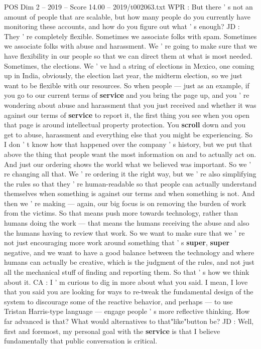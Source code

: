 \begin{textsample}{POS Dim 2 – 2019 – Score 14.00 – 2019/t002063.txt}
WPR : But there ' s not an amount of people that are scalable, but how many people do you currently have monitoring these accounts, and how do you figure out what ' s enough?
JD : They ' re completely flexible.
Sometimes we associate folks with spam.
Sometimes we associate folks with abuse and harassment.
We ' re going to make sure that we have flexibility in our people so that we can direct them at what is most needed.
Sometimes, the elections.
We ' ve had a string of elections in Mexico, one coming up in India, obviously, the election last year, the midterm election, so we just want to be flexible with our resources.
So when people — just as an example, if you go to our current terms of \textbf{service} and you bring the page up, and you ' re wondering about abuse and harassment that you just received and whether it was against our terms of \textbf{service} to report it, the first thing you see when you open that page is around intellectual property protection.
You \textbf{scroll} down and you get to abuse, harassment and everything else that you might be experiencing.
So I don ' t know how that happened over the company ' s history, but we put that above the thing that people want the most information on and to actually act on.
And just our ordering shows the world what we believed was important.
So we ' re changing all that.
We ' re ordering it the right way, but we ' re also simplifying the rules so that they ' re human-readable so that people can actually understand themselves when something is against our terms and when something is not.
And then we ' re making — again, our big focus is on removing the burden of work from the victims.
So that means push more towards technology, rather than humans doing the work — that means the humans receiving the abuse and also the humans having to review that work.
So we want to make sure that we ' re not just encouraging more work around something that ' s \textbf{super}, \textbf{super} negative, and we want to have a good balance between the technology and where humans can actually be creative, which is the judgment of the rules, and not just all the mechanical stuff of finding and reporting them.
So that ' s how we think about it.
CA : I ' m curious to dig in more about what you said.
I mean, I love that you said you are looking for ways to re-tweak the fundamental design of the system to discourage some of the reactive behavior, and perhaps — to use Tristan Harris-type language — engage people ' s more reflective thinking.
How far advanced is that?
What would alternatives to that"like"button be?
JD : Well, first and foremost, my personal goal with the \textbf{service} is that I believe fundamentally that public conversation is critical.

\end{textsample}
